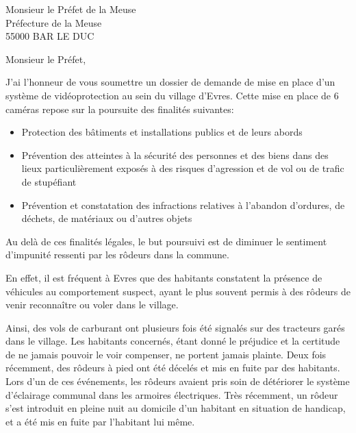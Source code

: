 \documentclass[12pt]{lettre}
\begin{document}
\begin{letter}{Monsieur le Préfet de la Meuse\\Préfecture de la Meuse\\55000 BAR LE DUC}




\address{Clément \textsc{Fevez}\\ Maire de Evres\\Place de la Halle\\55250 EVRES}
\nofax



\def\concname{Objet :~} %

\opening{Monsieur le Préfet,} 
J'ai l'honneur de vous soumettre un dossier de demande de mise en place d'un système de vidéoprotection au sein du village d'Evres.
Cette mise en place de 6 caméras repose sur la poursuite des finalités suivantes:


\begin{itemize}

\item Protection des bâtiments et installations publics et de leurs abords

\item Prévention des atteintes à la sécurité des personnes et des biens dans des lieux particulièrement exposés à des risques d'agression et de vol ou de trafic de stupéfiant

\item Prévention et constatation des infractions relatives à l'abandon d'ordures, de déchets, de matériaux ou d'autres objets

\end{itemize}
Au delà de ces finalités légales, le but poursuivi est de diminuer le sentiment d'impunité ressenti par les rôdeurs dans la commune.

En effet, il est fréquent à Evres que des habitants constatent la présence de véhicules au comportement suspect, ayant le plus souvent permis à des rôdeurs de venir reconnaître ou voler dans le village.

Ainsi, des vols de carburant ont plusieurs fois été signalés sur des tracteurs garés dans le village. Les habitants concernés, étant donné le préjudice et la certitude de ne jamais pouvoir le voir compenser, ne portent jamais plainte.
Deux fois récemment, des rôdeurs à pied ont été décelés et mis en fuite par des habitants. Lors d'un de ces événements, les rôdeurs avaient pris soin de détériorer le système d'éclairage communal dans les armoires électriques.
Très récemment, un rôdeur s'est introduit en pleine nuit au domicile d'un habitant en situation de handicap, et a été mis en fuite par l'habitant lui même.


\end{letter}
\end{document}
